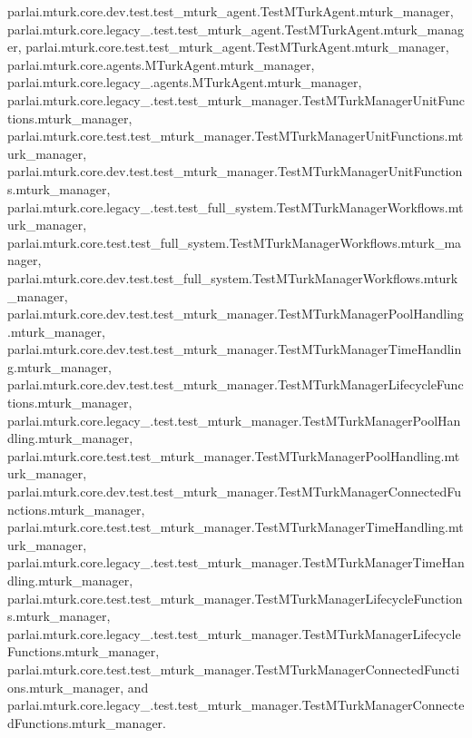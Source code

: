 parlai.\+mturk.\+core.\+dev.\+test.\+test\+\_\+mturk\+\_\+agent.\+Test\+M\+Turk\+Agent.\+mturk\+\_\+manager, parlai.\+mturk.\+core.\+legacy\+\_.\+test.\+test\+\_\+mturk\+\_\+agent.\+Test\+M\+Turk\+Agent.\+mturk\+\_\+manager, parlai.\+mturk.\+core.\+test.\+test\+\_\+mturk\+\_\+agent.\+Test\+M\+Turk\+Agent.\+mturk\+\_\+manager, parlai.\+mturk.\+core.\+agents.\+M\+Turk\+Agent.\+mturk\+\_\+manager, parlai.\+mturk.\+core.\+legacy\+\_.\+agents.\+M\+Turk\+Agent.\+mturk\+\_\+manager, parlai.\+mturk.\+core.\+legacy\+\_.\+test.\+test\+\_\+mturk\+\_\+manager.\+Test\+M\+Turk\+Manager\+Unit\+Functions.\+mturk\+\_\+manager, parlai.\+mturk.\+core.\+test.\+test\+\_\+mturk\+\_\+manager.\+Test\+M\+Turk\+Manager\+Unit\+Functions.\+mturk\+\_\+manager, parlai.\+mturk.\+core.\+dev.\+test.\+test\+\_\+mturk\+\_\+manager.\+Test\+M\+Turk\+Manager\+Unit\+Functions.\+mturk\+\_\+manager, parlai.\+mturk.\+core.\+legacy\+\_.\+test.\+test\+\_\+full\+\_\+system.\+Test\+M\+Turk\+Manager\+Workflows.\+mturk\+\_\+manager, parlai.\+mturk.\+core.\+test.\+test\+\_\+full\+\_\+system.\+Test\+M\+Turk\+Manager\+Workflows.\+mturk\+\_\+manager, parlai.\+mturk.\+core.\+dev.\+test.\+test\+\_\+full\+\_\+system.\+Test\+M\+Turk\+Manager\+Workflows.\+mturk\+\_\+manager, parlai.\+mturk.\+core.\+dev.\+test.\+test\+\_\+mturk\+\_\+manager.\+Test\+M\+Turk\+Manager\+Pool\+Handling.\+mturk\+\_\+manager, parlai.\+mturk.\+core.\+dev.\+test.\+test\+\_\+mturk\+\_\+manager.\+Test\+M\+Turk\+Manager\+Time\+Handling.\+mturk\+\_\+manager, parlai.\+mturk.\+core.\+dev.\+test.\+test\+\_\+mturk\+\_\+manager.\+Test\+M\+Turk\+Manager\+Lifecycle\+Functions.\+mturk\+\_\+manager, parlai.\+mturk.\+core.\+legacy\+\_.\+test.\+test\+\_\+mturk\+\_\+manager.\+Test\+M\+Turk\+Manager\+Pool\+Handling.\+mturk\+\_\+manager, parlai.\+mturk.\+core.\+test.\+test\+\_\+mturk\+\_\+manager.\+Test\+M\+Turk\+Manager\+Pool\+Handling.\+mturk\+\_\+manager, parlai.\+mturk.\+core.\+dev.\+test.\+test\+\_\+mturk\+\_\+manager.\+Test\+M\+Turk\+Manager\+Connected\+Functions.\+mturk\+\_\+manager, parlai.\+mturk.\+core.\+test.\+test\+\_\+mturk\+\_\+manager.\+Test\+M\+Turk\+Manager\+Time\+Handling.\+mturk\+\_\+manager, parlai.\+mturk.\+core.\+legacy\+\_.\+test.\+test\+\_\+mturk\+\_\+manager.\+Test\+M\+Turk\+Manager\+Time\+Handling.\+mturk\+\_\+manager, parlai.\+mturk.\+core.\+test.\+test\+\_\+mturk\+\_\+manager.\+Test\+M\+Turk\+Manager\+Lifecycle\+Functions.\+mturk\+\_\+manager, parlai.\+mturk.\+core.\+legacy\+\_.\+test.\+test\+\_\+mturk\+\_\+manager.\+Test\+M\+Turk\+Manager\+Lifecycle\+Functions.\+mturk\+\_\+manager, parlai.\+mturk.\+core.\+test.\+test\+\_\+mturk\+\_\+manager.\+Test\+M\+Turk\+Manager\+Connected\+Functions.\+mturk\+\_\+manager, and parlai.\+mturk.\+core.\+legacy\+\_.\+test.\+test\+\_\+mturk\+\_\+manager.\+Test\+M\+Turk\+Manager\+Connected\+Functions.\+mturk\+\_\+manager.

